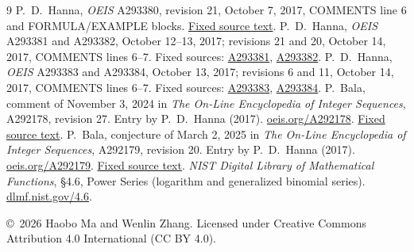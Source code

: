 \documentclass[11pt]{article}
\begin{document}
\begin{thebibliography}{9}
P.~D.~Hanna, \emph{OEIS} A293380, revision 21, October 7, 2017,
COMMENTS line 6 and FORMULA/EXAMPLE blocks.
\href{https://github.com/oeis/oeisdata/blob/3b4af0e758dc686db8f67f25863f4c9eb1a8f842/seq/A293/A293380.seq#L6}{Fixed source text}.
P.~D.~Hanna, \emph{OEIS} A293381 and A293382, October 12--13, 2017;
revisions 21 and 20, October 14, 2017, COMMENTS lines 6--7.
Fixed sources:
\href{https://github.com/oeis/oeisdata/blob/3b4af0e758dc686db8f67f25863f4c9eb1a8f842/seq/A293/A293381.seq#L6}{A293381},
\href{https://github.com/oeis/oeisdata/blob/3b4af0e758dc686db8f67f25863f4c9eb1a8f842/seq/A293/A293382.seq#L6}{A293382}.
P.~D.~Hanna, \emph{OEIS} A293383 and A293384, October 13, 2017;
revisions 6 and 11, October 14, 2017, COMMENTS lines 6--7.
Fixed sources:
\href{https://github.com/oeis/oeisdata/blob/3b4af0e758dc686db8f67f25863f4c9eb1a8f842/seq/A293/A293383.seq#L6}{A293383},
\href{https://github.com/oeis/oeisdata/blob/3b4af0e758dc686db8f67f25863f4c9eb1a8f842/seq/A293/A293384.seq#L6}{A293384}.
P.~Bala, comment of November 3, 2024 in
\emph{The On-Line Encyclopedia of Integer Sequences}, A292178,
revision 27. Entry by P.~D.~Hanna (2017).
\href{https://oeis.org/A292178}{oeis.org/A292178}.
\href{https://github.com/oeis/oeisdata/blob/571197984aeda7b8b680fe3a1f6a43f9898cd441/seq/A292/A292178.seq#L8}{Fixed source text}.
P.~Bala, conjecture of March 2, 2025 in
\emph{The On-Line Encyclopedia of Integer Sequences}, A292179,
revision 20. Entry by P.~D.~Hanna (2017).
\href{https://oeis.org/A292179}{oeis.org/A292179}.
\href{https://github.com/oeis/oeisdata/blob/733c77ba475e0b6fa0b8abe7681ef040217ae7f7/seq/A292/A292179.seq#L8}{Fixed source text}.
\emph{NIST Digital Library of Mathematical Functions},
\S4.6, Power Series (logarithm and generalized binomial series).
\href{https://dlmf.nist.gov/4.6}{dlmf.nist.gov/4.6}.
\end{thebibliography}
\noindent\small\copyright\ 2026 Haobo Ma and Wenlin Zhang.
Licensed under Creative Commons Attribution 4.0 International
(CC BY 4.0).
\end{document}
